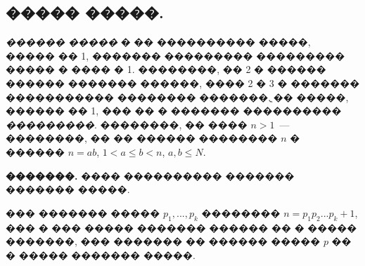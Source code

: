 \documentclass[a4paper,12pt]{article}
\begin{document}
\newpage

\begin{center}
\section*{����� �����.}
\end{center}

\textit{������ �����} � �� ���������� �����, ����� �� 1, ������� ��������� ��������� ����� � ���� � 1. ��������, �� 2 � ������ ������ ������� ������, ���� 2 � 3 � ������� ����������� �������� �������. ֳ�� �����, ������ �� 1, ��� �� � ������� ���������� \textit{���������}. ��������, �� ���� $n > 1$~--- ��������, �� �� ������ �������� $n$ � ������ $n = ab$, $1 < a \leq b < n$, $a,b \leq N$.

\textbf{�������.} ���� ���������� ������� ������� �����.

��� ������� ����� $p_{1},...,p_{k}$ �������� $n=p_{1}p_{2}...p_{k}+1$, ��� � ��� ����� ������� ������ �� � ����� �������, ��� ������� �� ������ ����� $p$ �� � ����� ������� �����.

\medskip\medskip\medskip
\end{document}
